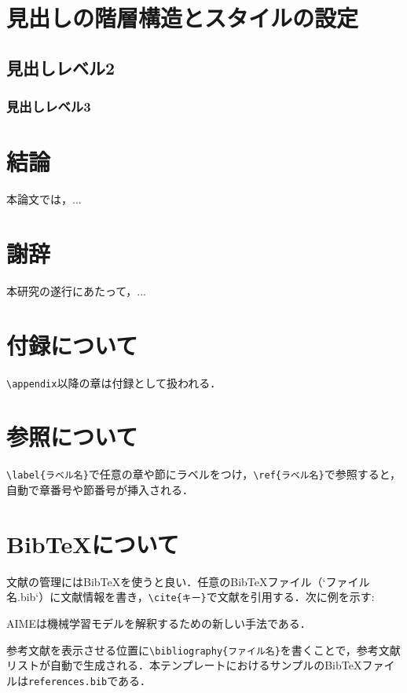 \documentclass[titlepage,12pt]{ltjsarticle}
\begin{document}
\section{見出しの階層構造とスタイルの設定}\label{sec:hierarchy_style}
\subsection{見出しレベル2}\label{subsec:level2}
\subsubsection{見出しレベル3}\label{subsubsec:level3}


\section{結論}\label{sec:conclusion}
本論文では，...

\section*{謝辞}
本研究の遂行にあたって，...




\appendix
\section{付録について}\label{app:appendix}
\texttt{\textbackslash{}appendix}以降の章は付録として扱われる．

\section{参照について}\label{app:ref}
\texttt{\textbackslash{}label\{ラベル名\}}で任意の章や節にラベルをつけ，\texttt{\textbackslash{}ref\{ラベル名\}}で参照すると，自動で章番号や節番号が挿入される．

\section{BibTeXについて}\label{app:bibtex}
文献の管理にはBibTeXを使うと良い．任意のBibTeXファイル（`ファイル名.bib`）に文献情報を書き，\texttt{\textbackslash{}cite\{キー\}}で文献を引用する．次に例を示す:

AIME\cite{AIME}は機械学習モデルを解釈するための新しい手法である．

参考文献を表示させる位置に\texttt{\textbackslash{}bibliography\{ファイル名\}}を書くことで，参考文献リストが自動で生成される．本テンプレートにおけるサンプルのBibTeXファイルは\texttt{references.bib}である．
\end{document}
